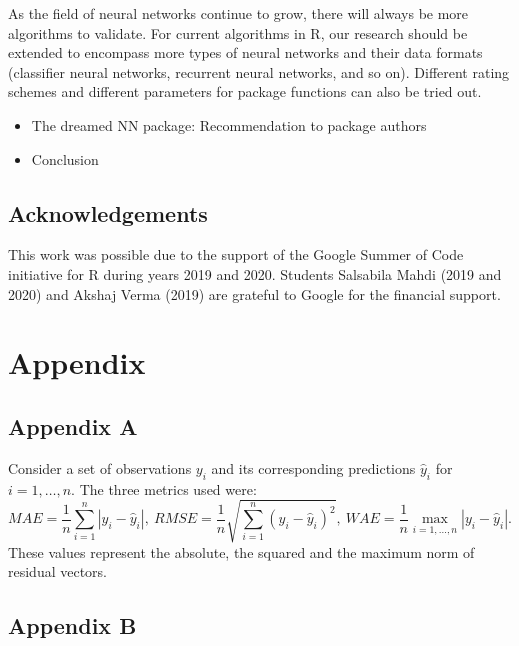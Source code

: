 As the field of neural networks continue to grow, there will always be
more algorithms to validate. For current algorithms in R, our research
should be extended to encompass more types of neural networks and their
data formats (classifier neural networks, recurrent neural networks, and
so on). Different rating schemes and different parameters for package
functions can also be tried out.

\begin{itemize}
\tightlist
\item
  The dreamed NN package: Recommendation to package authors
\item
  Conclusion
\end{itemize}

\hypertarget{acknowledgements}{%
\subsection{Acknowledgements}\label{acknowledgements}}

This work was possible due to the support of the Google Summer of Code
initiative for R during years 2019 and 2020. Students Salsabila Mahdi
(2019 and 2020) and Akshaj Verma (2019) are grateful to Google for the
financial support.



\hypertarget{appendix}{%
\section{Appendix}\label{appendix}}

\hypertarget{appendix-a}{%
\subsection{Appendix A}\label{appendix-a}}

Consider a set of observations \(y_i\) and its corresponding predictions
\(\hat y_i\) for \(i=1,\dots,n\). The three metrics used were: \[
MAE = \frac1n\sum_{i=1}^n|y_i - \hat y_i|,~
RMSE = \frac1n\sqrt{\sum_{i=1}^n(y_i - \hat y_i)^2},~
WAE = \frac1n\max_{i=1,\dots,n}|y_i - \hat y_i|.
\] These values represent the absolute, the squared and the maximum norm
of residual vectors.

\hypertarget{appendix-b}{%
\subsection{Appendix B}\label{appendix-b}}

